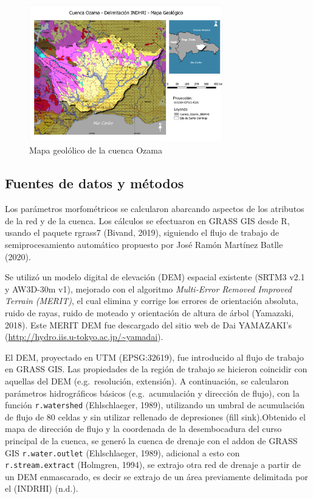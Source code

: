 \documentclass[11pt,]{article}
\begin{document}
\begin{figure}
\centering
\includegraphics[width=0.75000\textwidth]{Productos Generados/Cuenca_Mapa_Geologico.png}
\caption{\label{fig:geo_}Mapa geolólico de la cuenca Ozama}
\end{figure}

\subsection{Fuentes de datos y
métodos}\label{fuentes-de-datos-y-muxe9todos}

Los parámetros morfométricos se calcularon abarcando aspectos de los
atributos de la red y de la cuenca. Los cálculos se efectuaron en GRASS
GIS desde R, usando el paquete rgrass7 (Bivand, 2019), siguiendo el
flujo de trabajo de semiprocesamiento automático propuesto por José
Ramón Martínez Batlle (2020).

Se utilizó un modelo digital de elevación (DEM) espacial existente
(SRTM3 v2.1 y AW3D-30m v1), mejorado con el algoritmo \emph{Multi-Error
Removed Improved Terrain (MERIT)}, el cual elimina y corrige los errores
de orientación absoluta, ruido de rayas, ruido de moteado y orientación
de altura de árbol (Yamazaki, 2018). Este MERIT DEM fue descargado del
sitio web de Dai YAMAZAKI's
(\url{http://hydro.iis.u-tokyo.ac.jp/~yamadai}).

El DEM, proyectado en UTM (EPSG:32619), fue introducido al flujo de
trabajo en GRASS GIS. Las propiedades de la región de trabajo se
hicieron coincidir con aquellas del DEM (e.g.~resolución, extensión). A
continuación, se calcularon parámetros hidrográficos básicos
(e.g.~acumulación y dirección de flujo), con la función
\texttt{r.watershed} (Ehlschlaeger, 1989), utilizando un umbral de
acumulación de flujo de 80 celdas y sin utilizar rellenado de
depresiones (fill sink).Obtenido el mapa de dirección de flujo y la
coordenada de la desembocadura del curso principal de la cuenca, se
generó la cuenca de drenaje con el addon de GRASS GIS
\texttt{r.water.outlet} (Ehlschlaeger, 1989), adicional a esto con
\texttt{r.stream.extract} (Holmgren, 1994), se extrajo otra red de
drenaje a partir de un DEM enmascarado, es decir se extrajo de un área
previamente delimitada por el (INDRHI) (n.d.).
\end{document}
